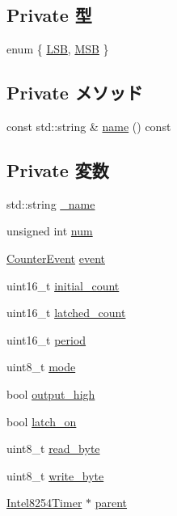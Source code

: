 \subsection*{Private 型}
\begin{DoxyCompactItemize}
\item 
enum \{ \hyperlink{classIntel8254Timer_1_1Counter_ae6dceca96ec2c7a1b4aa211264a87ef6ac8bd62065abff19ea8ce3ec18cf3d6fe}{LSB}, 
\hyperlink{classIntel8254Timer_1_1Counter_ae6dceca96ec2c7a1b4aa211264a87ef6aaf93e41af4961a7cd6042752d7ee66f8}{MSB}
 \}
\end{DoxyCompactItemize}
\subsection*{Private メソッド}
\begin{DoxyCompactItemize}
\item 
const std::string \& \hyperlink{classIntel8254Timer_1_1Counter_a324e8c54c4c5161913681a1a52fef959}{name} () const 
\end{DoxyCompactItemize}
\subsection*{Private 変数}
\begin{DoxyCompactItemize}
\item 
std::string \hyperlink{classIntel8254Timer_1_1Counter_aaf2ed934b37cbbd236fdd1b01a5f5005}{\_\-name}
\item 
unsigned int \hyperlink{classIntel8254Timer_1_1Counter_a41ddefd3473727cad32a9767c10faed8}{num}
\item 
\hyperlink{classIntel8254Timer_1_1Counter_1_1CounterEvent}{CounterEvent} \hyperlink{classIntel8254Timer_1_1Counter_afe2a9fb31bddd1ccdbd9814d1312325e}{event}
\item 
uint16\_\-t \hyperlink{classIntel8254Timer_1_1Counter_a0e6be215cd537b41b1961713f8deeb2d}{initial\_\-count}
\item 
uint16\_\-t \hyperlink{classIntel8254Timer_1_1Counter_a58144f724d350c0abc11d357a9a9f27d}{latched\_\-count}
\item 
uint16\_\-t \hyperlink{classIntel8254Timer_1_1Counter_a258408d6d5d13a24bfa5211d81ce1682}{period}
\item 
uint8\_\-t \hyperlink{classIntel8254Timer_1_1Counter_a37e90f5e3bd99fac2021fb3a326607d4}{mode}
\item 
bool \hyperlink{classIntel8254Timer_1_1Counter_a6c9d5e12c24d1d47d350b441b6d5c139}{output\_\-high}
\item 
bool \hyperlink{classIntel8254Timer_1_1Counter_ab723723029c7f0b3181accc4554a193c}{latch\_\-on}
\item 
uint8\_\-t \hyperlink{classIntel8254Timer_1_1Counter_a81105dfaa6881506c9e7e553ed1965c7}{read\_\-byte}
\item 
uint8\_\-t \hyperlink{classIntel8254Timer_1_1Counter_afd325bae49ff6d9215ad195a5267895a}{write\_\-byte}
\item 
\hyperlink{classIntel8254Timer}{Intel8254Timer} $\ast$ \hyperlink{classIntel8254Timer_1_1Counter_a86e82cfefcf778560bdfcdfffadac005}{parent}
\end{DoxyCompactItemize}


